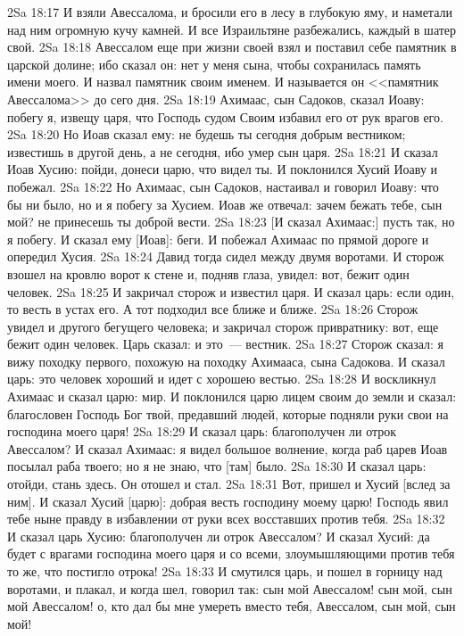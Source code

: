 \vs 2Sa 18:17 И взяли Авессалома, и бросили его в лесу в глубокую яму, и наметали над ним огромную кучу камней. И все Израильтяне разбежались, каждый в шатер свой.
\vs 2Sa 18:18 Авессалом еще при жизни своей взял и поставил себе памятник в царской долине; ибо сказал он: нет у меня сына, чтобы сохранилась память имени моего. И назвал памятник своим именем. И называется он <<памятник Авессалома>> до сего дня.
\rsbpar\vs 2Sa 18:19 Ахимаас, сын Садоков, сказал Иоаву: побегу я, извещу царя, что Господь судом Своим избавил его от рук врагов его.
\vs 2Sa 18:20 Но Иоав сказал ему: не будешь ты сегодня добрым вестником; известишь в другой день, а не сегодня, ибо умер сын царя.
\vs 2Sa 18:21 И сказал Иоав Хусию: пойди, донеси царю, что видел ты. И поклонился Хусий Иоаву и побежал.
\vs 2Sa 18:22 Но Ахимаас, сын Садоков, настаивал и говорил Иоаву: что бы ни было, но и я побегу за Хусием. Иоав же отвечал: зачем бежать тебе, сын мой? не принесешь ты доброй вести.
\vs 2Sa 18:23 [И сказал Ахимаас:] пусть так, но я побегу. И сказал ему [Иоав]: беги. И побежал Ахимаас по прямой дороге и опередил Хусия.
\vs 2Sa 18:24 Давид тогда сидел между двумя воротами. И сторож взошел на кровлю ворот к стене и, подняв глаза, увидел: вот, бежит один человек.
\vs 2Sa 18:25 И закричал сторож и известил царя. И сказал царь: если один, то весть в устах его. А тот подходил все ближе и ближе.
\vs 2Sa 18:26 Сторож увидел и другого бегущего человека; и закричал сторож привратнику: вот, еще бежит один человек. Царь сказал: и это~--- вестник.
\vs 2Sa 18:27 Сторож сказал: я вижу походку первого, похожую на походку Ахимааса, сына Садокова. И сказал царь: это человек хороший и идет с хорошею вестью.
\vs 2Sa 18:28 И воскликнул Ахимаас и сказал царю: мир. И поклонился царю лицем своим до земли и сказал: благословен Господь Бог твой, предавший людей, которые подняли руки свои на господина моего царя!
\vs 2Sa 18:29 И сказал царь: благополучен ли отрок Авессалом? И сказал Ахимаас: я видел большое волнение, когда раб царев Иоав посылал раба твоего; но я не знаю, что [там] было.
\vs 2Sa 18:30 И сказал царь: отойди, стань здесь. Он отошел и стал.
\vs 2Sa 18:31 Вот, пришел и Хусий [вслед за ним]. И сказал Хусий [царю]: добрая весть господину моему царю! Господь явил тебе ныне правду в избавлении от руки всех восставших против тебя.
\vs 2Sa 18:32 И сказал царь Хусию: благополучен ли отрок Авессалом? И сказал Хусий: да будет с врагами господина моего царя и со всеми, злоумышляющими против тебя то же, что постигло отрока!
\vs 2Sa 18:33 И смутился царь, и пошел в горницу над воротами, и плакал, и когда шел, говорил так: сын мой Авессалом! сын мой, сын мой Авессалом! о, кто дал бы мне умереть вместо тебя, Авессалом, сын мой, сын мой!
